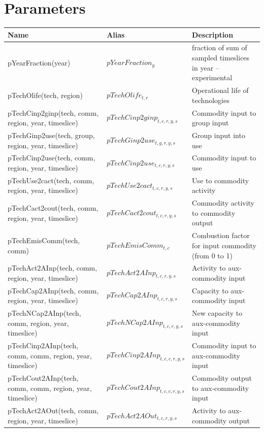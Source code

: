 \documentclass{article}
\begin{document}
\section*{Parameters}
\begin{longtable}{|p{10cm}|p{5cm}|p{9cm}|}
\hline
\bf{Name} & \bf{Alias}  & \bf{Description} \\
 \hline
pYearFraction(year) & $pYearFraction_{y}$ & fraction of sum of sampled timeslices in year -- experimental \\
 \hline
pTechOlife(tech, region) & $pTechOlife_{t,r}$ & Operational life of technologies \\
 \hline
pTechCinp2ginp(tech, comm, region, year, timeslice) & $pTechCinp2ginp_{t,c,r,y,s}$ & Commodity input to group input \\
 \hline
pTechGinp2use(tech, group, region, year, timeslice) & $pTechGinp2use_{t,g,r,y,s}$ & Group input into use \\
 \hline
pTechCinp2use(tech, comm, region, year, timeslice) & $pTechCinp2use_{t,c,r,y,s}$ & Commodity input to use \\
 \hline
pTechUse2cact(tech, comm, region, year, timeslice) & $pTechUse2cact_{t,c,r,y,s}$ & Use to commodity activity \\
 \hline
pTechCact2cout(tech, comm, region, year, timeslice) & $pTechCact2cout_{t,c,r,y,s}$ & Commodity activity to commodity output \\
 \hline
pTechEmisComm(tech, comm) & $pTechEmisComm_{t,c}$ & Combustion factor for input commodity (from 0 to 1) \\
 \hline
pTechAct2AInp(tech, comm, region, year, timeslice) & $pTechAct2AInp_{t,c,r,y,s}$ & Activity to aux-commodity input \\
 \hline
pTechCap2AInp(tech, comm, region, year, timeslice) & $pTechCap2AInp_{t,c,r,y,s}$ & Capacity to aux-commodity input \\
 \hline
pTechNCap2AInp(tech, comm, region, year, timeslice) & $pTechNCap2AInp_{t,c,r,y,s}$ & New capacity to aux-commodity input \\
 \hline
pTechCinp2AInp(tech, comm, comm, region, year, timeslice) & $pTechCinp2AInp_{t,c,c,r,y,s}$ & Commodity input to aux-commodity input \\
 \hline
pTechCout2AInp(tech, comm, comm, region, year, timeslice) & $pTechCout2AInp_{t,c,c,r,y,s}$ & Commodity output to aux-commodity input \\
 \hline
pTechAct2AOut(tech, comm, region, year, timeslice) & $pTechAct2AOut_{t,c,r,y,s}$ & Activity to aux-commodity output \\

\end{longtable}
\end{document}

